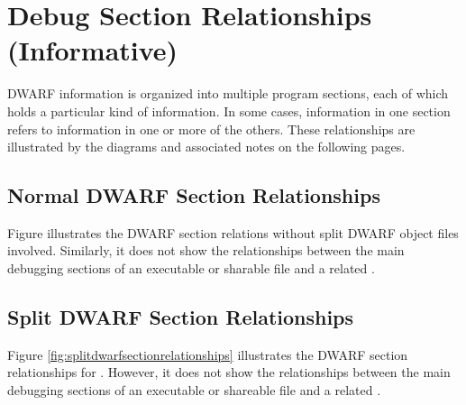 \chapter{Debug Section Relationships (Informative)}
\label{app:debugsectionrelationshipsinformative}
DWARF information is organized into multiple program sections, 
each of which holds a particular kind of information. In some 
cases, information in one section refers to information in one 
or more of the others. These relationships are illustrated by 
the diagrams and associated notes on the following pages.

\section{Normal DWARF Section Relationships}
Figure  illustrates
the DWARF section relations without split DWARF object files
involved. Similarly, it does not show the 
relationships between the main debugging sections of an executable
or sharable file and a related .

\section{Split DWARF Section Relationships}
Figure \ref{fig:splitdwarfsectionrelationships} illustrates
the DWARF section relationships for .
However, it does not show the 
relationships between the main debugging sections of an executable
or shareable file and a related .

